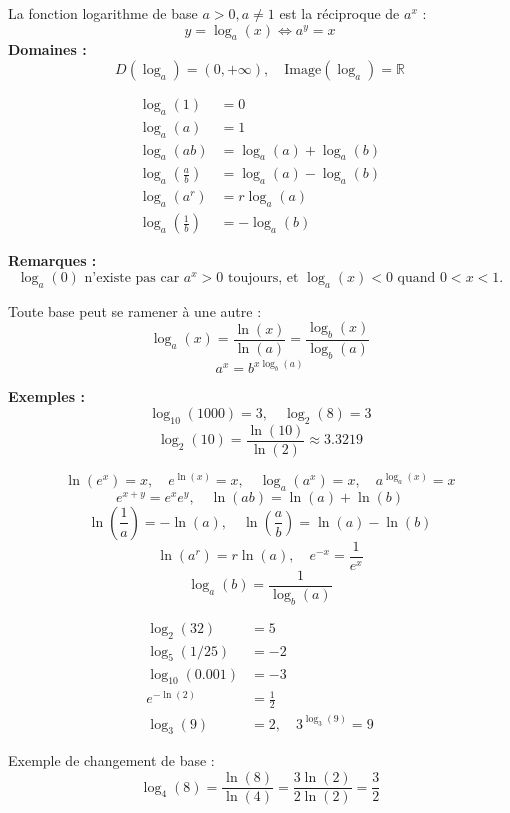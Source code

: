 \documentclass[11pt,a4paper]{article}
\newcommand{\rulebox}[3]{
\begin{tcolorbox}[colback=#1!10!white,colframe=#1!60!black,title=\textbf{#2}]
#3
\end{tcolorbox}
}
\begin{document}
\rulebox{purple}{7. Définition du logarithme de base $a$}{
La fonction logarithme de base $a>0, a\neq1$ est la réciproque de $a^x$ :
\[
y=\log_a(x) \Longleftrightarrow a^y = x
\]
\textbf{Domaines :}
\[
D(\log_a)=(0,+\infty), \quad \text{Image}(\log_a)=\mathbb{R}
\]

}

\rulebox{blue}{8. Propriétés du logarithme (toutes bases)}{
\[
\begin{aligned}
\log_a(1) &= 0 \\
\log_a(a) &= 1 \\
\log_a(ab) &= \log_a(a) + \log_a(b) \\
\log_a\!\left(\frac{a}{b}\right) &= \log_a(a) - \log_a(b) \\
\log_a(a^r) &= r\log_a(a) \\
\log_a\!\left(\frac{1}{b}\right) &= -\log_a(b)
\end{aligned}
\]

\textbf{Remarques :}
\[
\log_a(0) \text{ n’existe pas car } a^x>0 \text{ toujours, et } \log_a(x)<0 \text{ quand } 0<x<1.
\]
}

\rulebox{green}{9. Changement de base}{
Toute base peut se ramener à une autre :
\[
\log_a(x) = \frac{\ln(x)}{\ln(a)} = \frac{\log_b(x)}{\log_b(a)}
\]
\[
a^x = b^{x\log_b(a)}
\]

\textbf{Exemples :}
\[
\log_{10}(1000) = 3, \quad \log_2(8) = 3
\]
\[
\log_2(10) = \frac{\ln(10)}{\ln(2)} \approx 3.3219
\]
}

\rulebox{orange}{10. Combinaisons et inversions fréquentes}{
\[
\ln(e^x) = x, \quad e^{\ln(x)} = x, \quad \log_a(a^x)=x, \quad a^{\log_a(x)}=x
\]
\[
e^{x+y} = e^x e^y, \quad \ln(ab)=\ln(a)+\ln(b)
\]
\[
\ln\!\left(\frac{1}{a}\right) = -\ln(a), \quad \ln\!\left(\frac{a}{b}\right) = \ln(a)-\ln(b)
\]
\[
\ln(a^r) = r\ln(a), \quad e^{-x}=\frac{1}{e^x}
\]
\[
\log_a(b) = \frac{1}{\log_b(a)}
\]
}

\rulebox{gray}{11. Exemples concrets}{
\[
\begin{aligned}
\log_2(32) &= 5 \\
\log_5(1/25) &= -2 \\
\log_{10}(0.001) &= -3 \\
e^{-\ln(2)} &= \frac{1}{2} \\
\log_3(9) &= 2, \quad 3^{\log_3(9)}=9
\end{aligned}
\]

Exemple de changement de base :
\[
\log_4(8) = \frac{\ln(8)}{\ln(4)} = \frac{3\ln(2)}{2\ln(2)} = \frac{3}{2}
\]
}
\end{document}
